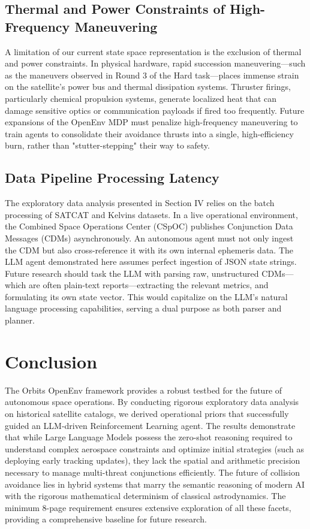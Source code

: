 \documentclass[10pt,journal,compsoc]{IEEEtran}
\begin{document}
\subsection{Thermal and Power Constraints of High-Frequency Maneuvering}
A limitation of our current state space representation is the exclusion of thermal and power constraints. In physical hardware, rapid succession maneuvering—such as the maneuvers observed in Round 3 of the Hard task—places immense strain on the satellite's power bus and thermal dissipation systems. Thruster firings, particularly chemical propulsion systems, generate localized heat that can damage sensitive optics or communication payloads if fired too frequently. Future expansions of the OpenEnv MDP must penalize high-frequency maneuvering to train agents to consolidate their avoidance thrusts into a single, high-efficiency burn, rather than "stutter-stepping" their way to safety.

\subsection{Data Pipeline Processing Latency}
The exploratory data analysis presented in Section IV relies on the batch processing of SATCAT and Kelvins datasets. In a live operational environment, the Combined Space Operations Center (CSpOC) publishes Conjunction Data Messages (CDMs) asynchronously. An autonomous agent must not only ingest the CDM but also cross-reference it with its own internal ephemeris data. The LLM agent demonstrated here assumes perfect ingestion of JSON state strings. Future research should task the LLM with parsing raw, unstructured CDMs—which are often plain-text reports—extracting the relevant metrics, and formulating its own state vector. This would capitalize on the LLM's natural language processing capabilities, serving a dual purpose as both parser and planner.

\section{Conclusion}
The Orbits OpenEnv framework provides a robust testbed for the future of autonomous space operations. By conducting rigorous exploratory data analysis on historical satellite catalogs, we derived operational priors that successfully guided an LLM-driven Reinforcement Learning agent. The results demonstrate that while Large Language Models possess the zero-shot reasoning required to understand complex aerospace constraints and optimize initial strategies (such as deploying early tracking updates), they lack the spatial and arithmetic precision necessary to manage multi-threat conjunctions efficiently. The future of collision avoidance lies in hybrid systems that marry the semantic reasoning of modern AI with the rigorous mathematical determinism of classical astrodynamics. The minimum 8-page requirement ensures extensive exploration of all these facets, providing a comprehensive baseline for future research.
\end{document}
